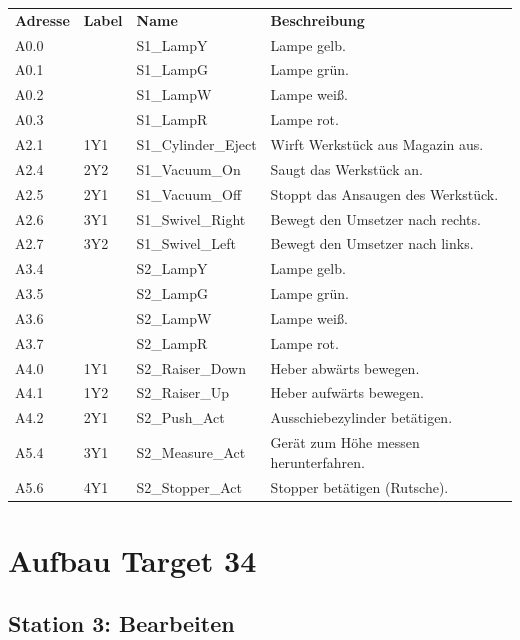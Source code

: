 \documentclass[11pt,a4paper,ngerman]{article}
\begin{document}
\begin{center}
	\begin{tabularx}{\textwidth}{|p{1.5cm}|p{1cm}|p{4cm}|X|}
		\hline
		\rowcolor{tublau}
		\multicolumn{4}{|c|}{\bf \color{white} \large Ausgänge}\\
		\hline\hline
		\rowcolor{gray!80}
		\bf Adresse & \bf Label & \bf Name & \bf Beschreibung \\
		\hline\hline
		A0.0 &  & S1\_LampY & Lampe gelb.\\
		A0.1 &  & S1\_LampG & Lampe grün.\\
		A0.2 &  & S1\_LampW & Lampe weiß.\\
		A0.3 &  & S1\_LampR & Lampe rot.\\
		A2.1 & 1Y1 & S1\_Cylinder\_Eject & Wirft Werkstück aus Magazin aus.\\
		A2.4 & 2Y2 & S1\_Vacuum\_On & Saugt das Werkstück an.\\
		A2.5 & 2Y1 & S1\_Vacuum\_Off & Stoppt das Ansaugen des Werkstück.\\
		A2.6 & 3Y1 & S1\_Swivel\_Right & Bewegt den Umsetzer nach rechts.\\
		A2.7 & 3Y2 & S1\_Swivel\_Left & Bewegt den Umsetzer nach links.\\
		\hline
		A3.4 &  & S2\_LampY & Lampe gelb.\\
		A3.5 &  & S2\_LampG & Lampe grün.\\
		A3.6 &  & S2\_LampW & Lampe weiß.\\
		A3.7 &  & S2\_LampR & Lampe rot.\\
		A4.0 & 1Y1 & S2\_Raiser\_Down & Heber abwärts bewegen.\\
		A4.1 & 1Y2 & S2\_Raiser\_Up & Heber aufwärts bewegen.\\
		A4.2 & 2Y1 & S2\_Push\_Act & Ausschiebezylinder betätigen.\\
		A5.4 & 3Y1 & S2\_Measure\_Act & Gerät zum Höhe messen herunterfahren.\\
		A5.6 & 4Y1 & S2\_Stopper\_Act & Stopper betätigen (Rutsche).\\
		\hline
	\end{tabularx}
\end{center}






\section{Aufbau Target 34}

\subsection{Station 3: Bearbeiten}
\end{document}
